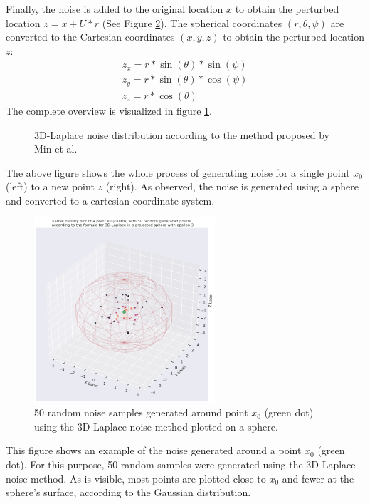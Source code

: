 Finally, the noise is added to the original location $x$ to obtain the perturbed location $z = x + U*r$ (See Figure \ref{fig:3d-laplace-noise}).
The spherical coordinates $(r, \theta, \psi)$ are converted to the Cartesian coordinates $(x, y, z)$ to obtain the perturbed location $z$:
\begin{align*}
  z_x = r * \sin(\theta) * \sin(\psi) \\
  z_y = r * \sin(\theta) * \cos(\psi) \\
  z_z = r * \cos(\theta)
\end{align*}
The complete overview is visualized in figure \ref{fig:3d-laplace}.
\begin{figure}[H]
  
  \caption{3D-Laplace noise distribution according to the method proposed by Min et al. \citep{9646489}}
  \label{fig:3d-laplace}
\end{figure}
The above figure shows the whole process of generating noise for a single point $x_0$ (left) to a new point $z$ (right).
As observed, the noise is generated using a sphere and converted to a cartesian coordinate system.
\newpage
\begin{figure}[H]
  \includegraphics[width=0.6\textwidth]{TheorethicalFramework/ND-Laplace/Images/3d_laplace_noise.png}
  \caption{50 random noise samples generated around point $x_0$ (green dot) using the 3D-Laplace noise method \citep{9646489} plotted on a sphere.}
  \label{fig:3d-laplace-noise}
\end{figure}
This figure shows an example of the noise generated around a point $x_0$ (green dot).
For this purpose, 50 random samples were generated using the 3D-Laplace noise method.
As is visible, most points are plotted close to $x_0$ and fewer at the sphere's surface, according to the Gaussian distribution.

